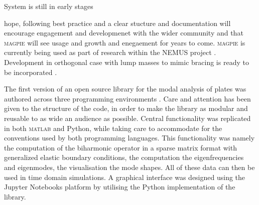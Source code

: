 System is still in early stages 

hope, following best practice and a clear stucture and documentation will encourage engagement and developmenet \cite{OSS_EGAEMENT} with the wider community and that \textsc{magpie} will see usage and growth and enegaement for years to come. \textsc{magpie} is currently being used as part of research within the NEMUS project \cite{}. Development in orthogonal case with lump masses to mimic bracing is ready to be incorporated \cite{ducceschi_method_2024}.

The first version of an open source library for the modal analysis of plates was authored across three programming environments \cite{magpie_python_2025,magpie_cpp_2025,magpie_matlab_2025}. 
Care and attention has been given to the structure of the code, in order to make the library as modular and reusable to as wide an audience as possible. Central functionality was replicated in both \textsc{matlab} and Python, while taking care to accommodate for the conventions used by both programming languages. This functionality was namely the computation of the biharmonic operator in a sparse matrix format with generalized elastic boundary conditions, the computation the eigenfrequencies and eigenmodes, the visualisation the mode shapes. All of these data can then be used in time domain simulations. A graphical interface was designed using the Jupyter Notebooks platform by utilising the Python implementation of the library.


